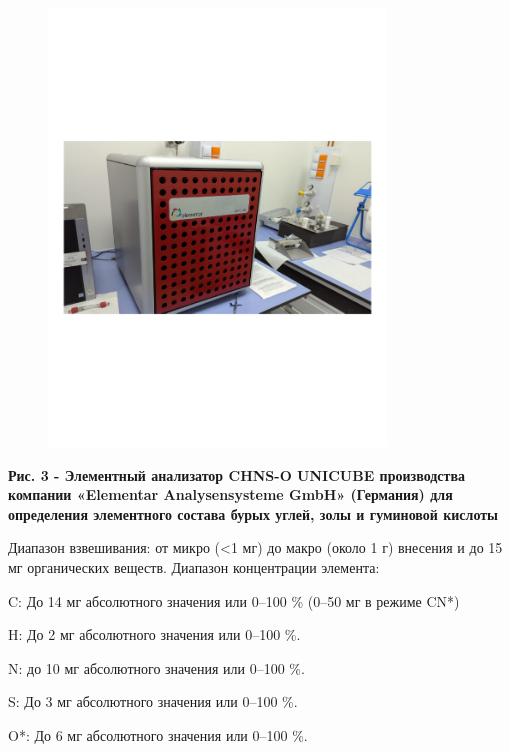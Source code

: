 \begin{figure}[H]
	\centering
	\includegraphics[width=0.8\textwidth]{media/gorn3/image10}
	\caption*{}
\end{figure}


{\bfseries Рис. 3 - Элементный анализатор CHNS-O UNICUBE производства
компании «Elementar Analysensysteme GmbH» (Германия) для определения
элементного состава бурых углей, золы и гуминовой кислоты}

Диапазон взвешивания: от микро (\textless1 мг) до макро (около 1 г)
внесения и до 15 мг органических веществ. Диапазон концентрации
элемента:

C: До 14 мг абсолютного значения или 0--100 \% (0--50 мг в режиме CN*)

H: До 2 мг абсолютного значения или 0--100 \%.

N: до 10 мг абсолютного значения или 0--100 \%.

S: До 3 мг абсолютного значения или 0--100 \%.

O*: До 6 мг абсолютного значения или 0--100 \%.

